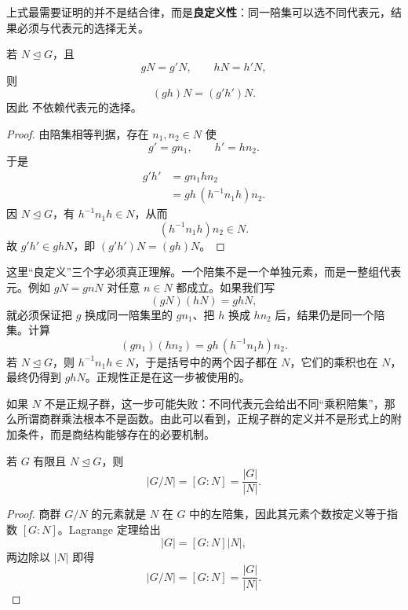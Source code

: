 上式最需要证明的并不是结合律，而是\textbf{良定义性}：同一陪集可以选不同代表元，结果必须与代表元的选择无关。

\begin{theorem}[商群乘法的良定义性]
若 $N\mathrel{\trianglelefteq} G$，且
\[
gN=g'N,
\qquad
hN=h'N,
\]
则
\[
(gh)N=(g'h')N.
\]
因此 不依赖代表元的选择。
\label{thm:quotient-well-defined}

\end{theorem}

\begin{proof}
由陪集相等判据，存在 $n_1,n_2\in N$ 使
\[
g'=gn_1,
\qquad
h'=hn_2.
\]
于是
\begin{align*}
g'h'
&=gn_1hn_2\\
&=gh\,(h^{-1}n_1h)n_2.
\end{align*}
因 $N\mathrel{\trianglelefteq} G$，有 $h^{-1}n_1h\in N$，从而
\[
(h^{-1}n_1h)n_2\in N.
\]
故 $g'h'\in ghN$，即 $(g'h')N=(gh)N$。
\end{proof}

这里“良定义”三个字必须真正理解。一个陪集不是一个单独元素，而是一整组代表元。例如 $gN=gnN$ 对任意 $n\in N$ 都成立。如果我们写
\[
(gN)(hN)=ghN,
\]
就必须保证把 $g$ 换成同一陪集里的 $gn_1$、把 $h$ 换成 $hn_2$ 后，结果仍是同一个陪集。计算
\[
(gn_1)(hn_2)=gh\,(h^{-1}n_1h)n_2.
\]
若 $N\mathrel{\trianglelefteq} G$，则 $h^{-1}n_1h\in N$，于是括号中的两个因子都在 $N$，它们的乘积也在 $N$，最终仍得到 $ghN$。正规性正是在这一步被使用的。

如果 $N$ 不是正规子群，这一步可能失败：不同代表元会给出不同“乘积陪集”，那么所谓商群乘法根本不是函数。由此可以看到，正规子群的定义并不是形式上的附加条件，而是商结构能够存在的必要机制。


\begin{corollary}[有限商群的阶]
若 $G$ 有限且 $N\mathrel{\trianglelefteq} G$，则
\[
\lvert G/N\rvert=[G:N]=\frac{\lvert G\rvert}{\lvert N\rvert}.
\]
\label{cor:quotient-order}

\end{corollary}

\begin{proof}
商群 $G/N$ 的元素就是 $N$ 在 $G$ 中的左陪集，因此其元素个数按定义等于指数 $[G:N]$。Lagrange 定理给出
\[
|G|=[G:N]|N|,
\]
两边除以 $|N|$ 即得
\[
|G/N|=[G:N]=\frac{|G|}{|N|}.
\]
\end{proof}

